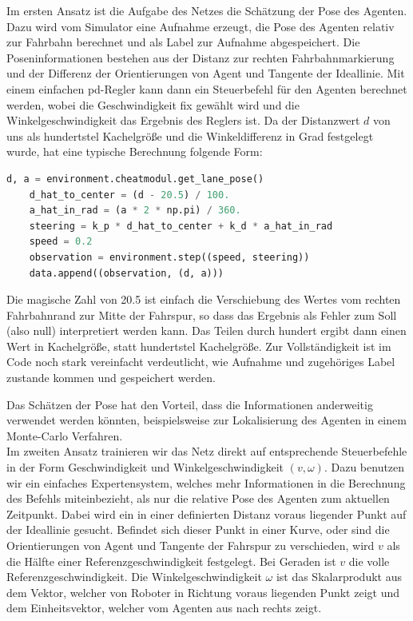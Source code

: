 Im ersten Ansatz ist die Aufgabe des Netzes die Schätzung der Pose des Agenten. Dazu wird vom Simulator eine Aufnahme erzeugt, die Pose des Agenten relativ zur Fahrbahn berechnet und als Label zur Aufnahme abgespeichert. Die Poseninformationen bestehen aus der Distanz zur rechten Fahrbahnmarkierung und der Differenz der Orientierungen von Agent und Tangente der Ideallinie. Mit einem einfachen \acs{pd}-Regler kann dann ein Steuerbefehl für den Agenten berechnet werden, wobei die Geschwindigkeit fix gewählt wird und die Winkelgeschwindigkeit das Ergebnis des Reglers ist. Da der Distanzwert $d$ von uns als hundertstel Kachelgröße und die Winkeldifferenz in Grad festgelegt wurde, hat eine typische Berechnung folgende Form:\\

\begin{minipage}{\linewidth}
	\begin{lstlisting}[caption={Berechnung eines Steuerbefehls mit \acs{pd}-Regler}, language=python]
	d, a = environment.cheatmodul.get_lane_pose()
	d_hat_to_center = (d - 20.5) / 100.
	a_hat_in_rad = (a * 2 * np.pi) / 360.
	steering = k_p * d_hat_to_center + k_d * a_hat_in_rad
	speed = 0.2
	observation = environment.step((speed, steering))
	data.append((observation, (d, a)))
	\end{lstlisting}
\end{minipage}

\vspace{.5cm}
Die magische Zahl von 20.5 ist einfach die Verschiebung des Wertes vom rechten Fahrbahnrand zur Mitte der Fahrspur, so dass das Ergebnis als Fehler zum Soll (also null) interpretiert werden kann. Das Teilen durch hundert ergibt dann einen Wert in Kachelgröße, statt hundertstel Kachelgröße.
Zur Vollständigkeit ist im Code noch stark vereinfacht verdeutlicht, wie Aufnahme und zugehöriges Label zustande kommen und gespeichert werden.

Das Schätzen der Pose hat den Vorteil, dass die Informationen anderweitig verwendet werden könnten, beispielsweise zur Lokalisierung des Agenten in einem Monte-Carlo Verfahren.\\

Im zweiten Ansatz trainieren wir das Netz direkt auf entsprechende Steuerbefehle in der Form Geschwindigkeit und Winkelgeschwindigkeit $(v, \omega)$. Dazu benutzen wir ein einfaches Expertensystem, welches mehr Informationen in die Berechnung des Befehls miteinbezieht, als nur die relative Pose des Agenten zum aktuellen Zeitpunkt. Dabei wird ein in einer definierten Distanz voraus liegender Punkt auf der Ideallinie gesucht. Befindet sich dieser Punkt in einer Kurve, oder sind die Orientierungen von Agent und Tangente der Fahrspur zu verschieden, wird $v$ als die Hälfte einer Referenzgeschwindigkeit festgelegt. Bei Geraden ist $v$ die volle Referenzgeschwindigkeit. Die Winkelgeschwindigkeit $\omega$ ist das Skalarprodukt aus dem Vektor, welcher von Roboter in Richtung voraus liegenden Punkt zeigt und dem Einheitsvektor, welcher vom Agenten aus nach rechts zeigt.

